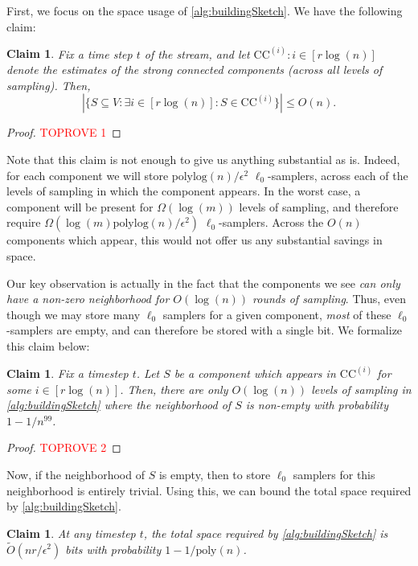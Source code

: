 \documentclass[11pt]{article}
\newtheorem{claim}[theorem]{Claim}
\theoremstyle{definition}
\newcommand{\eps}{\epsilon}
\newcommand{\polylog}{\mathrm{polylog}}
\begin{document}
First, we focus on the space usage of \cref{alg:buildingSketch}. We have the following claim:

\begin{claim}
	Fix a time step $t$ of the stream, and let $\mathrm{CC}^{(i)}: i \in [r \log(n)]$ denote the estimates of the strong connected components (across all levels of sampling). Then,
	\[
	|\{S \subseteq V: \exists i \in [r \log(n)]: S \in \mathrm{CC}^{(i)} \}| \leq O(n).
	\]
\end{claim}

\begin{proof}\textcolor{red}{TOPROVE 1}\end{proof}

Note that this claim is not enough to give us anything substantial as is. Indeed, for each component we will store $\mathrm{polylog}(n) / \eps^2$ $\ell_0$-samplers, across each of the levels of sampling in which the component appears. In the worst case, a component will be present for $\Omega(\log(m))$ levels of sampling, and therefore require $\Omega(\log(m) \polylog(n) / \eps^2)$ $\ell_0$-samplers. Across the $O(n)$ components which appear, this would not offer us any substantial savings in space. 

Our key observation is actually in the fact that the components we see \emph{can only have a non-zero neighborhood for $O(\log(n))$ rounds of sampling}. Thus, even though we may store many $\ell_0$ samplers for a given component, \emph{most} of these $\ell_0$-samplers are empty, and can therefore be stored with a single bit. We formalize this claim below:

\begin{claim}\label{clm:numberLevelsInsertion}
	Fix a timestep $t$. Let $S$ be a component which appears in $\mathrm{CC}^{(i)}$ for some $i \in [r \log(n)]$. Then, there are only $O(\log(n))$ levels of sampling in \cref{alg:buildingSketch} where the neighborhood of $S$ is non-empty with probability $1 - 1 / n^{99}$.
\end{claim}

\begin{proof}\textcolor{red}{TOPROVE 2}\end{proof}

Now, if the neighborhood of $S$ is empty, then to store $\ell_0$ samplers for this neighborhood is entirely trivial. Using this, we can bound the total space required by \cref{alg:buildingSketch}.

\begin{claim}\label{clm:sketchSpaceInsertion}
	At any timestep $t$, the total space required by \cref{alg:buildingSketch} is $\widetilde{O}(nr / \eps^2)$ bits with probability $1 - 1 / \mathrm{poly}(n)$.
\end{claim}
\end{document}

